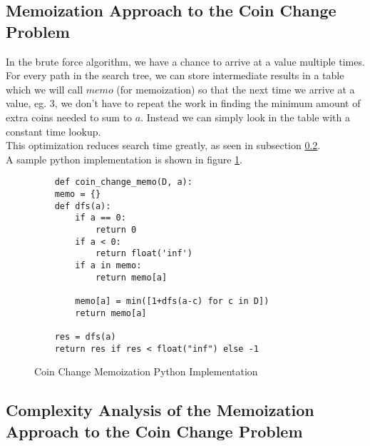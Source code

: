 \subsection{Memoization Approach to the Coin Change Problem}

In the brute force algorithm, we have a chance to arrive at a value multiple times. For every path in the search tree,
we can store intermediate results in a table which we will call $memo$ (for memoization) 
so that the next time we arrive at a value, eg. 3, we don't have to repeat the work in finding the minimum amount of extra coins needed to sum to $a$.
Instead we can simply look in the table with a constant time lookup.\\
This optimization reduces search time greatly, as seen in subsection \ref{subsec:ca-coin-change-memo}.\\
A sample python implementation is shown in figure \ref{fig:coin-change-memo}.

\begin{figure}[H]
    \centering
    \begin{lstlisting}
    def coin_change_memo(D, a):
    memo = {}
    def dfs(a):
        if a == 0:
            return 0
        if a < 0:
            return float('inf')
        if a in memo:
            return memo[a]
        
        memo[a] = min([1+dfs(a-c) for c in D])
        return memo[a]
            
    res = dfs(a)
    return res if res < float("inf") else -1
    \end{lstlisting}
    \caption{Coin Change Memoization Python Implementation}
    \label{fig:coin-change-memo}
\end{figure}

\subsection{Complexity Analysis of the Memoization Approach to the Coin Change Problem}\label{subsec:ca-coin-change-memo}

